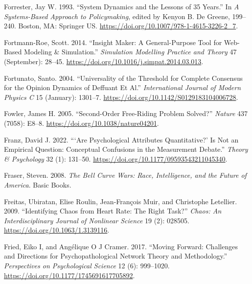 \documentclass[
  letterpaper,
]{scrbook}
\newlength{\cslhangindent}
\newlength{\cslentryspacingunit} %
\newenvironment{CSLReferences}[2] %
 {%
  \setlength{\parindent}{0pt}
  \ifodd #1
  \let\oldpar\par
  \def\par{\hangindent=\cslhangindent\oldpar}
  \fi
  \setlength{\parskip}{#2\cslentryspacingunit}
 }%
 {}
\begin{document}
\begin{CSLReferences}{1}{0}
\leavevmode{}%
Forrester, Jay W. 1993. {``System {Dynamics} and the {Lessons} of 35
{Years}.''} In \emph{A {Systems-Based Approach} to {Policymaking}},
edited by Kenyon B. De Greene, 199--240. {Boston, MA}: {Springer US}.
\url{https://doi.org/10.1007/978-1-4615-3226-2_7}.

\leavevmode{}%
Fortmann-Roe, Scott. 2014. {``Insight {Maker}: {A} General-Purpose Tool
for Web-Based Modeling \& Simulation.''} \emph{Simulation Modelling
Practice and Theory} 47 (September): 28--45.
\url{https://doi.org/10.1016/j.simpat.2014.03.013}.

\leavevmode{}%
Fortunato, Santo. 2004. {``Universality of the {Threshold} for {Complete
Consensus} for the {Opinion Dynamics} of {Deffuant} Et Al.''}
\emph{International Journal of Modern Physics C} 15 (January): 1301--7.
\url{https://doi.org/10.1142/S0129183104006728}.

\leavevmode{}%
Fowler, James H. 2005. {``Second-Order Free-Riding Problem Solved?''}
\emph{Nature} 437 (7058): E8--8.
\url{https://doi.org/10.1038/nature04201}.

\leavevmode{}%
Franz, David J. 2022. {``{`{Are} Psychological Attributes
Quantitative?'} Is Not an Empirical Question: {Conceptual} Confusions in
the Measurement Debate.''} \emph{Theory \& Psychology} 32 (1): 131--50.
\url{https://doi.org/10.1177/09593543211045340}.

\leavevmode{}%
Fraser, Steven. 2008. \emph{The {Bell Curve Wars}: {Race},
{Intelligence}, and the {Future} of {America}}. {Basic Books}.

\leavevmode{}%
Freitas, Ubiratan, Elise Roulin, Jean-François Muir, and Christophe
Letellier. 2009. {``Identifying Chaos from Heart Rate: {The} Right
Task?''} \emph{Chaos: An Interdisciplinary Journal of Nonlinear Science}
19 (2): 028505. \url{https://doi.org/10.1063/1.3139116}.

\leavevmode{}%
Fried, Eiko I, and Angélique O J Cramer. 2017. {``Moving {Forward}:
{Challenges} and {Directions} for {Psychopathological Network Theory}
and {Methodology}.''} \emph{Perspectives on Psychological Science} 12
(6): 999--1020. \url{https://doi.org/10.1177/1745691617705892}.


\end{CSLReferences}
\end{document}
